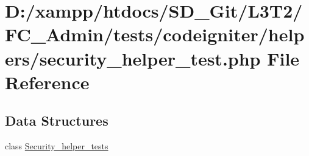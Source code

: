 \hypertarget{security__helper__test_8php}{}\section{D\+:/xampp/htdocs/\+S\+D\+\_\+\+Git/\+L3\+T2/\+F\+C\+\_\+\+Admin/tests/codeigniter/helpers/security\+\_\+helper\+\_\+test.php File Reference}
\label{security__helper__test_8php}
\subsection*{Data Structures}
\begin{DoxyCompactItemize}
\item 
class \hyperlink{class_security__helper__tests}{Security\+\_\+helper\+\_\+tests}
\end{DoxyCompactItemize}
